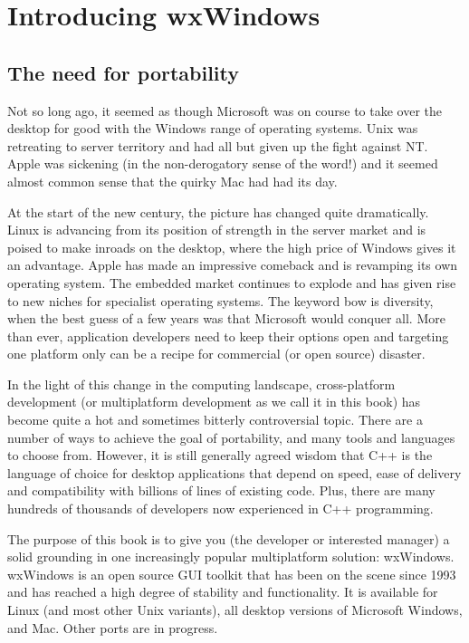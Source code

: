 \chapter{Introducing wxWindows}\label{chapintro}
%
%
\setfooter{\thepage}{}{}{}{}{\thepage}%

\section{The need for portability}

Not so long ago, it seemed as though Microsoft was on course to
take over the desktop for good with the Windows range of
operating systems. Unix was retreating to server territory and
had all but given up the fight against NT. Apple was sickening
(in the non-derogatory sense of the word!) and it seemed almost
common sense that the quirky Mac had had its day.

At the start of the new century, the picture has changed quite
dramatically. Linux is advancing from its position of strength
in the server market and is poised to make inroads on the
desktop, where the high price of Windows gives it an advantage.
Apple has made an impressive comeback and is revamping its own
operating system. The embedded market continues to explode and
has given rise to new niches for specialist operating systems.
The keyword bow is diversity, when the best guess of a few years
was that Microsoft would conquer all. More than ever,
application developers need to keep their options open and
targeting one platform only can be a recipe for commercial (or
open source) disaster.

In the light of this change in the computing landscape,
cross-platform development (or multiplatform development as we
call it in this book) has become quite a hot and sometimes
bitterly controversial topic. There are a number of ways to
achieve the goal of portability, and many tools and languages to choose from.
However, it is still generally agreed wisdom that C++ is the
language of choice for desktop applications that depend on
speed, ease of delivery and compatibility with billions of lines
of existing code. Plus, there are many hundreds of thousands of
developers now experienced in C++ programming.

The purpose of this book is to give you (the developer or
interested manager) a solid grounding in one increasingly
popular multiplatform solution: wxWindows. wxWindows is an open
source GUI toolkit that has been on the scene since 1993 and has
reached a high degree of stability and functionality. It is
available for Linux (and most other Unix variants), all desktop
versions of Microsoft Windows, and Mac. Other ports are in
progress.

